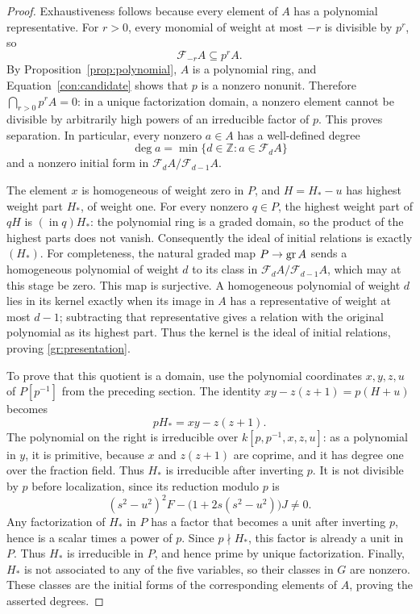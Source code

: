\begin{proof}
Exhaustiveness follows because every element of $A$ has a polynomial
representative.  For $r>0$, every monomial of weight at most $-r$ is
divisible by $p^r$, so
\[
 \mathcal F_{-r}A\subseteq p^rA.
\]
By Proposition~\ref{prop:polynomial}, $A$ is a polynomial ring, and
Equation~\eqref{con:candidate} shows that $p$ is a nonzero nonunit.
Therefore $\bigcap_{r>0}p^rA=0$: in a unique
factorization domain, a nonzero element cannot be divisible by
arbitrarily high powers of an irreducible factor of $p$.
This proves separation.  In particular, every nonzero $a\in A$ has a
well-defined degree
\[
 \deg a=\min\{d\in\mathbb Z:a\in\mathcal F_dA\}
\]
and a nonzero initial form in $\mathcal F_dA/\mathcal F_{d-1}A$.

The element $x$ is homogeneous of weight zero in $P$, and
$H=H_*-u$ has highest weight part $H_*$, of weight one.
For every nonzero $q\in P$, the highest weight part of $qH$ is
$(\operatorname{in}q)H_*$: the polynomial ring is a graded domain,
so the product of the highest parts does not vanish.
Consequently the ideal of initial relations is exactly $(H_*)$.
For completeness, the natural graded map $P\to\operatorname{gr} A$ sends a homogeneous
polynomial of weight $d$ to its class in
$\mathcal F_dA/\mathcal F_{d-1}A$, which may at this stage be zero.
This map is surjective.
A homogeneous polynomial of weight $d$ lies in its kernel exactly
when its image in $A$ has a representative of weight at most $d-1$;
subtracting that representative gives a relation with the original
polynomial as its highest part.  Thus the kernel is the ideal of
initial relations, proving \eqref{gr:presentation}.

To prove that this quotient is a domain, use the polynomial
coordinates $x,y,z,u$ of $P[p^{-1}]$ from the preceding section.
The identity $xy-z(z+1)=p(H+u)$ becomes
\[
 pH_*=xy-z(z+1).
\]
The polynomial on the right is irreducible over
$k[p,p^{-1},x,z,u]$: as a polynomial in $y$, it is primitive,
because $x$ and $z(z+1)$ are coprime, and it has degree one over
the fraction field.  Thus $H_*$ is irreducible after inverting $p$.
It is not divisible by $p$ before localization, since its reduction
modulo $p$ is
\[
 (s^2-u^2)^2F-\bigl(1+2s(s^2-u^2)\bigr)J\ne0.
\]
Any factorization of $H_*$ in $P$ has a factor that becomes a unit after
inverting $p$, hence is a scalar times a power of $p$.
Since $p\nmid H_*$, this factor is already a unit in $P$.
Thus $H_*$ is irreducible in $P$, and hence prime by unique factorization.
Finally, $H_*$ is not associated to any
of the five variables, so their classes in $G$ are nonzero.
These classes are the initial forms of the corresponding elements
of $A$, proving the asserted degrees.
\end{proof}

